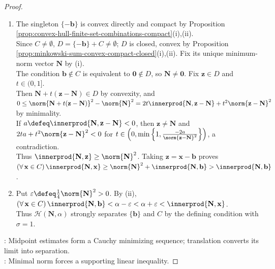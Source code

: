 \begin{theorem}
\begin{proof}
\begin{enumerate}[label=(\roman*)]
Put $N_r\defeq\sup\{a_{q,r}:q\geq1\}$. Then $a_{q,r}\leq N_r\leq b_{q,r}$ by nestedness, so $x_{j,r}\to N_r$.\\
For $\mathbf{N}_C\defeq(N_1,\ldots,N_n)$, $\norm{\mathbf{x}_j-\mathbf{N}_C}^2=\sum\limits_{r=1}^{n}\abs{x_{j,r}-N_r}^2\to0$. If $\mathbf{N}_C\notin C$, fix $\rho>0$ with $B_\rho(\mathbf{N}_C)\subseteq\R^n\setminus C$ by openness of $\R^n\setminus C$, contradicting $\mathbf{x}_j\to\mathbf{N}_C$; hence $\mathbf{N}_C\in C$. Also $\norm{\mathbf{x}_j}\to\norm{\mathbf{N}_C}$ by Proposition \ref{prop:reverse-triangle-inequality-inner-product}, so $\norm{\mathbf{N}_C}^2=m$.\\
If $\mathbf{u},\mathbf{v}\in C$ both have squared norm $m$, then $\mathbf{w}\defeq\frac{1}{2}(\mathbf{u}+\mathbf{v})\in C$, $m\leq\norm{\mathbf{w}}^2=m-\frac{1}{4}\norm{\mathbf{u}-\mathbf{v}}^2$ by Theorem \ref{thm:parallelogram-identity-inner-product}; thus $\mathbf{u}=\mathbf{v}$.
\item The singleton $\{-\mathbf{b}\}$ is convex directly and compact by Proposition \ref{prop:convex-hull-finite-set-combinations-compact}(i),(ii).\\
Since $C\neq\emptyset$, $D=\{-\mathbf{b}\}+C\neq\emptyset$; $D$ is closed, convex by Proposition \ref{prop:minkowski-sum-convex-compact-closed}(i),(ii). Fix its unique minimum-norm vector $\mathbf{N}$ by (i).\\
The condition $\mathbf{b}\notin C$ is equivalent to $\mathbf{0}\notin D$, so $\mathbf{N}\neq\mathbf{0}$. Fix $\mathbf{z}\in D$ and $t\in(0,1]$.\\
Then $\mathbf{N}+t(\mathbf{z}-\mathbf{N})\in D$ by convexity, and $0\leq\norm{\mathbf{N}+t(\mathbf{z}-\mathbf{N})}^2-\norm{\mathbf{N}}^2=2t\innerprod{\mathbf{N},\mathbf{z}-\mathbf{N}}+t^2\norm{\mathbf{z}-\mathbf{N}}^2$ by minimality.\\
If $a\defeq\innerprod{\mathbf{N},\mathbf{z}-\mathbf{N}}<0$, then $\mathbf{z}\neq\mathbf{N}$ and $2ta+t^2\norm{\mathbf{z}-\mathbf{N}}^2<0$ for $t\in\left(0,\min\left\{1,\frac{-2a}{\norm{\mathbf{z}-\mathbf{N}}^2}\right\}\right)$, a contradiction.\\
Thus $\innerprod{\mathbf{N},\mathbf{z}}\geq\norm{\mathbf{N}}^2$. Taking $\mathbf{z}=\mathbf{x}-\mathbf{b}$ proves $(\forall\,\mathbf{x}\in C)\,\innerprod{\mathbf{N},\mathbf{x}}\geq\norm{\mathbf{N}}^2+\innerprod{\mathbf{N},\mathbf{b}}>\innerprod{\mathbf{N},\mathbf{b}}$.
\item Put $\varepsilon\defeq\frac{1}{4}\norm{\mathbf{N}}^2>0$. By (ii), $(\forall\,\mathbf{x}\in C)\,\innerprod{\mathbf{N},\mathbf{b}}<\alpha-\varepsilon<\alpha+\varepsilon<\innerprod{\mathbf{N},\mathbf{x}}$.\\
Thus $\mathcal{H}(\mathbf{N},\alpha)$ strongly separates $\{\mathbf{b}\}$ and $C$ by the defining condition with $\sigma=1$.
\end{enumerate}
: Midpoint estimates form a Cauchy minimizing sequence; translation converts its limit into separation.\\
: Minimal norm forces a supporting linear inequality.
\end{proof}
\end{theorem}

